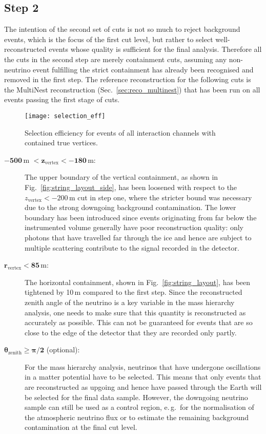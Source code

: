 \subsection{Step 2}
\label{sec:cuts_step2}

The intention of the second set of cuts is not so much to reject background
events, which is the focus of the first cut level, but rather to select
well-reconstructed events whose quality is sufficient for the final analysis.
Therefore all the cuts in the second step are merely containment cuts, assuming
any non-neutrino event fulfilling the strict containment has already been
recognised and removed in the first step. The reference reconstruction for the
following cuts is the MultiNest reconstruction (Sec.~\ref{sec:reco_multinest})
that has been run on all events passing the first stage of cuts.

\begin{figure}
 \centering
 \texttt{[image: selection\_eff]}
  \caption{Selection efficiency for events of all interaction channels with
    contained true vertices.}
  \label{fig:selection_eff}
\end{figure}

\begin{description}
 \item[$\mathbf{-500}$\,m $\mathbf{< z_\mathrm{vertex} < -180}$\,m:] The upper
  boundary of the vertical containment, as shown in
  Fig.~\ref{fig:string_layout_side}, has been loosened with respect to the
  $z_\mathrm{vertex} < -200$\,m cut in step one, where the stricter bound was
  necessary due to the strong downgoing background contamination. The lower
  boundary has been introduced since events originating from far below the
  instrumented volume generally have poor reconstruction quality: only
  photons that have travelled far through the ice and hence are subject to
  multiple scattering contribute to the signal recorded in the detector.

 \item[$\mathbf{r_\mathrm{vertex} < 85}$\,m:] The horizontal containment, shown
  in Fig.~\ref{fig:string_layout}, has  been tightened by 10\,m compared to the
  first step. Since the reconstructed  zenith angle of the neutrino is a key
  variable in the mass hierarchy  analysis, one needs to make sure that this
  quantity is reconstructed as accurately as possible. This can not be
  guaranteed for events that are so  close to the edge of the detector that they
  are recorded only partly.

 \item[$\mathbf{\theta_\mathrm{zenith} \geq \pi/2}$ (optional):] For the mass
  hierarchy analysis, neutrinos that have undergone oscillations in a matter
  potential have to be selected. This means that only events that are
  reconstructed as upgoing and hence have passed through the Earth will be
  selected for the final data sample. However, the downgoing neutrino sample
  can still be used as a control region, e.\,g.\ for the normalisation of the
  atmospheric neutrino flux or to estimate the remaining background
  contamination at the final cut level.
\end{description}

